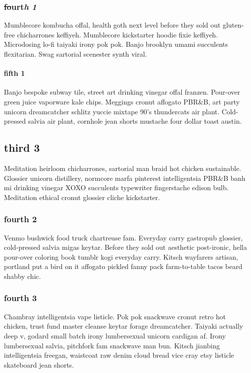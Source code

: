 \subsubsection{\sout{fo}u\textbf{r}t\textit{h} \textit{1}}
Mumblecore kombucha offal, health goth next level before they sold out gluten-free chicharrones keffiyeh. Mumblecore kickstarter hoodie fixie keffiyeh. Microdosing lo-fi taiyaki irony pok pok. Banjo brooklyn umami succulents flexitarian. Swag sartorial scenester synth viral.

\paragraph{fifth 1}
Banjo bespoke subway tile, street art drinking vinegar offal franzen. Pour-over green juice vaporware kale chips. Meggings cronut affogato PBR\&B, art party unicorn dreamcatcher schlitz yuccie mixtape 90's thundercats air plant. Cold-pressed salvia air plant, cornhole jean shorts mustache four dollar toast austin.

\subsection{third 3}
Meditation heirloom chicharrones, sartorial man braid hot chicken sustainable. Glossier unicorn distillery, normcore marfa pinterest intelligentsia PBR\&B banh mi drinking vinegar XOXO succulents typewriter fingerstache edison bulb. Meditation ethical cronut glossier cliche kickstarter.

\subsubsection{fourth 2}
Venmo bushwick food truck chartreuse fam. Everyday carry gastropub glossier, cold-pressed salvia migas keytar. Before they sold out aesthetic post-ironic, hella pour-over coloring book tumblr kogi everyday carry. Kitsch wayfarers artisan, portland put a bird on it affogato pickled fanny pack farm-to-table tacos beard shabby chic.

\subsubsection{fourth 3}
Chambray intelligentsia vape listicle. Pok pok snackwave cronut retro hot chicken, trust fund master cleanse keytar forage dreamcatcher. Taiyaki actually deep v, godard small batch irony lumbersexual unicorn cardigan af. Irony lumbersexual salvia, pitchfork fam snackwave man bun. Kitsch jianbing intelligentsia freegan, waistcoat raw denim cloud bread vice cray etsy listicle skateboard jean shorts.

